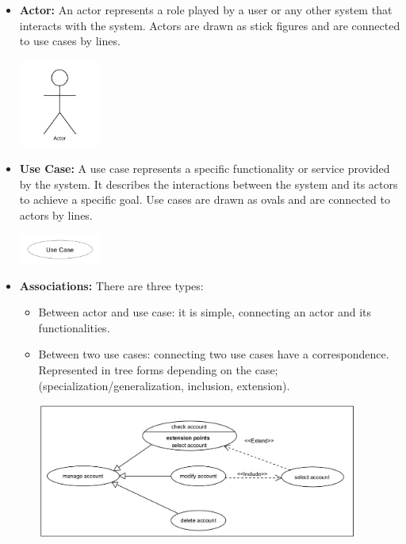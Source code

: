 \documentclass{article}
\begin{document}
\begin{itemize}
    \item \textbf{Actor:} An actor represents a role played by a user or any other system that interacts with the system. Actors are drawn as stick figures and are connected to use cases by lines.
    \begin{center}
        \includegraphics[width=100px]{media/actor.jpg}
    \end{center}
    \item \textbf{Use Case:} A use case represents a specific functionality or service provided by the system. It describes the interactions between the system and its actors to achieve a specific goal. Use cases are drawn as ovals and are connected to actors by lines.
    \begin{center}
        \includegraphics[width=100px]{media/use_case.jpg}
    \end{center}
    \item \textbf{Associations:} There are three types:
    \begin{itemize}
        \item Between actor and use case: it is simple, connecting an actor and its functionalities.
        \item Between two use cases: connecting two use cases have a correspondence. Represented in tree forms depending on the case; (specialization/generalization, inclusion, extension).
        \begin{center}
            \includegraphics[width=400px]{media/use_case_relations.jpg}

\end{center}
\end{itemize}
\end{itemize}
\end{document}
